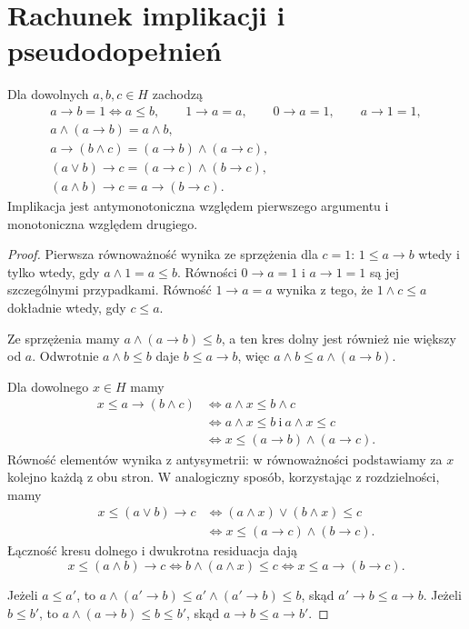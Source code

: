\section{Rachunek implikacji i pseudodopełnień}

\begin{twierdzenie}
\label{thm:ncl-heyting-implication-laws}
Dla dowolnych $a,b,c\in H$ zachodzą
\[
\begin{gathered}
 a\to b=1\iff a\leq b,\qquad
 1\to a=a,\qquad 0\to a=1,\qquad a\to1=1,\\
 a\wedge(a\to b)=a\wedge b,\\
 a\to(b\wedge c)=(a\to b)\wedge(a\to c),\\
 (a\vee b)\to c=(a\to c)\wedge(b\to c),\\
 (a\wedge b)\to c=a\to(b\to c).
\end{gathered}
\]
Implikacja jest antymonotoniczna względem pierwszego
argumentu i monotoniczna względem drugiego.
\end{twierdzenie}
\begin{proof}
Pierwsza równoważność wynika ze sprzężenia dla
$c=1$: $1\leq a\to b$ wtedy i tylko wtedy,
gdy $a\wedge1=a\leq b$.
Równości $0\to a=1$ i $a\to1=1$ są jej
szczególnymi przypadkami. Równość $1\to a=a$
wynika z tego, że $1\wedge c\leq a$ dokładnie
wtedy, gdy $c\leq a$.

Ze sprzężenia mamy $a\wedge(a\to b)\leq b$,
a ten kres dolny jest również nie większy od $a$.
Odwrotnie $a\wedge b\leq b$ daje $b\leq a\to b$,
więc $a\wedge b\leq a\wedge(a\to b)$.

Dla dowolnego $x\in H$ mamy
\[
\begin{aligned}
 x\leq a\to(b\wedge c)
 &\iff a\wedge x\leq b\wedge c\\
 &\iff a\wedge x\leq b\ \text{i}\ a\wedge x\leq c\\
 &\iff x\leq(a\to b)\wedge(a\to c).
\end{aligned}
\]
Równość elementów wynika z antysymetrii:
w równoważności podstawiamy za $x$ kolejno
każdą z obu stron. W analogiczny sposób,
korzystając z rozdzielności, mamy
\[
\begin{aligned}
 x\leq(a\vee b)\to c
 &\iff (a\wedge x)\vee(b\wedge x)\leq c\\
 &\iff x\leq(a\to c)\wedge(b\to c).
\end{aligned}
\]
Łączność kresu dolnego i dwukrotna residuacja dają
\[
 x\leq(a\wedge b)\to c
 \iff b\wedge(a\wedge x)\leq c
 \iff x\leq a\to(b\to c).
\]

Jeżeli $a\leq a'$, to
$a\wedge(a'\to b)\leq a'\wedge(a'\to b)\leq b$,
skąd $a'\to b\leq a\to b$.
Jeżeli $b\leq b'$, to
$a\wedge(a\to b)\leq b\leq b'$,
skąd $a\to b\leq a\to b'$.
\end{proof}

